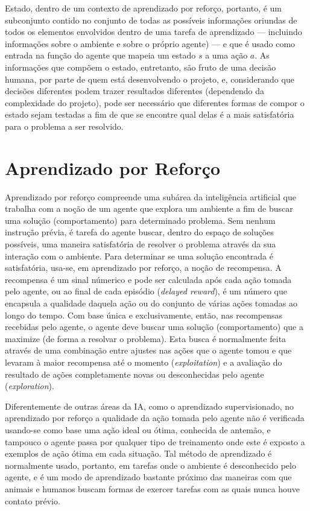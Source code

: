 \documentclass[cic,tc]{iiufrgs}
\begin{document}
Estado, dentro de um contexto de aprendizado por reforço, portanto, é um subconjunto contido no conjunto de todas as possíveis informações oriundas
de todos os elementos envolvidos dentro de uma tarefa de aprendizado  --- incluindo informações sobre o ambiente e sobre o próprio agente) --- e que é usado
como entrada na função do agente que mapeia um estado $s$ a uma
ação $a$. As informações que compõem o estado, entretanto, são fruto de uma decisão humana, por parte de quem está desenvolvendo o projeto, e,
considerando que decisões diferentes podem trazer resultados diferentes (dependendo da complexidade do projeto), pode ser necessário
que diferentes formas de compor o estado sejam testadas a fim de que se encontre qual delas é a mais satisfatória para o problema a ser resolvido.

%

\section{Aprendizado por Reforço}

Aprendizado por reforço compreende uma subárea da inteligência artificial que trabalha com a noção de um agente que explora um ambiente
a fim de buscar uma solução (comportamento) para determinado problema. Sem nenhum instrução prévia, é tarefa do agente buscar, dentro do espaço
de soluções possíveis, uma maneira satisfatória de resolver o problema através da sua interação com o ambiente.
Para determinar se uma solução encontrada é satisfatória, usa-se, em aprendizado por reforço, a noção de recompensa. A recompensa é um sinal númerico e pode ser calculada após cada ação tomada pelo agente, ou ao final de cada episódio (\textit{delayed reward}), é um número que encapsula a
qualidade daquela ação ou do conjunto de várias ações tomadas ao longo do tempo. Com base única e exclusivamente, então, nas recompensas recebidas pelo agente,
o agente deve buscar uma solução (comportamento) que a maximize (de forma a resolvar o problema). Esta busca  é normalmente feita através
de uma combinação entre ajustes nas ações que o agente tomou e que levaram à maior recompensa até o momento (\textit{exploitation}) e a avaliação do resultado de ações completamente
novas ou desconhecidas pelo agente (\textit{exploration}).


Diferentemente de outras áreas da IA, como o aprendizado supervisionado, no aprendizado por reforço a qualidade da ação tomada pelo agente não
é verificada usando-se como base uma ação ideal ou ótima,  conhecida de antemão, e tampouco o agente passa por qualquer tipo de treinamento onde este é exposto a
exemplos de ação ótima em cada situação. Tal método de aprendizado é normalmente usado, portanto, em tarefas onde o ambiente é desconhecido
pelo agente, e é um modo de aprendizado bastante próximo das maneiras com que
animais e humanos buscam formas de exercer tarefas com as quais nunca houve contato prévio.
\end{document}

